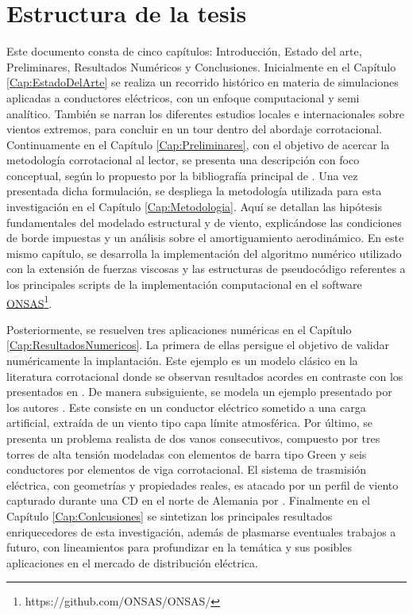 \section{Estructura de la tesis}

Este documento consta de cinco capítulos: Introducción, Estado del arte, Preliminares, Resultados Numéricos y Conclusiones. Inicialmente en el Capítulo \ref{Cap:EstadoDelArte} se realiza un recorrido histórico en materia de simulaciones aplicadas a conductores eléctricos, con un enfoque computacional y semi analítico. También se narran los diferentes estudios locales e internacionales sobre vientos extremos, para concluir en un tour dentro del abordaje corrotacional. Continuamente en el Capítulo \ref{Cap:Preliminares}, con el objetivo de acercar la metodología corrotacional al lector, se presenta una descripción con foco conceptual, según lo propuesto por la bibliografía principal de \citet{Le2014}. Una vez presentada dicha formulación, se despliega la metodología utilizada para esta investigación en el Capítulo \ref{Cap:Metodologia}. Aquí se detallan las hipótesis fundamentales del modelado estructural y de viento, explicándose las condiciones de borde impuestas y un análisis sobre el amortiguamiento aerodinámico. En este mismo capítulo, se desarrolla la implementación del algoritmo numérico utilizado con la extensión de fuerzas viscosas y las estructuras de pseudocódigo referentes a los principales scripts de la implementación computacional en el software \href{https://github.com/ONSAS/ONSAS/}{ONSAS}\footnote{https://github.com/ONSAS/ONSAS/}. 


Posteriormente, se resuelven tres aplicaciones numéricas en el Capítulo \ref{Cap:ResultadosNumericos}. La primera de ellas persigue el objetivo de validar numéricamente la implantación. Este ejemplo es un modelo clásico en la literatura corrotacional donde se observan resultados acordes en contraste con los presentados en \cite{Le2014}. De manera subsiguiente, se modela un ejemplo presentado por los autores \cite{Foti2016}. Este consiste en un conductor eléctrico sometido a una carga artificial, extraída de un viento tipo capa límite atmosférica. Por último, se presenta un problema realista de dos vanos consecutivos, compuesto por tres torres de alta tensión modeladas con elementos de barra tipo Green y seis conductores por elementos de viga corrotacional. El sistema de trasmisión eléctrica, con geometrías y propiedades reales, es atacado por un perfil de viento capturado durante una CD en el norte de Alemania por \cite{stengel2017measurements}. Finalmente en el Capítulo \ref{Cap:Conlcusiones} se sintetizan los principales resultados enriquecedores de esta investigación, además de plasmarse eventuales trabajos a futuro, con lineamientos para profundizar en la temática y sus posibles aplicaciones en el mercado de distribución eléctrica.
